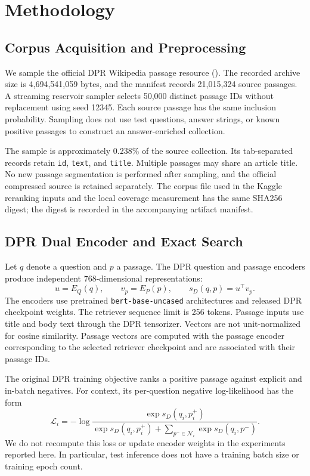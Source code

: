 \section{Methodology}
\subsection{Corpus Acquisition and Preprocessing}
We sample the official DPR Wikipedia passage resource (). The recorded archive size is 4,694,541,059 bytes, and the manifest records 21,015,324 source passages. A streaming reservoir sampler selects 50,000 distinct passage IDs without replacement using seed 12345. Each source passage has the same inclusion probability. Sampling does not use test questions, answer strings, or known positive passages to construct an answer-enriched collection.

The sample is approximately 0.238\% of the source collection. Its tab-separated records retain \texttt{id}, \texttt{text}, and \texttt{title}. Multiple passages may share an article title. No new passage segmentation is performed after sampling, and the official compressed source is retained separately. The corpus file used in the Kaggle reranking inputs and the local coverage measurement has the same SHA256 digest; the digest is recorded in the accompanying artifact manifest.

\subsection{DPR Dual Encoder and Exact Search}
Let $q$ denote a question and $p$ a passage. The DPR question and passage encoders produce independent 768-dimensional representations:
\begin{equation}
u=E_Q(q),\qquad v_p=E_P(p),\qquad s_D(q,p)=u^{\top}v_p.
\label{eq:dpr}
\end{equation}
The encoders use pretrained \texttt{bert-base-uncased} architectures and released DPR checkpoint weights. The retriever sequence limit is 256 tokens. Passage inputs use title and body text through the DPR tensorizer. Vectors are not unit-normalized for cosine similarity. Passage vectors are computed with the passage encoder corresponding to the selected retriever checkpoint and are associated with their passage IDs.

The original DPR training objective ranks a positive passage against explicit and in-batch negatives. For context, its per-question negative log-likelihood has the form
\begin{equation}
\mathcal{L}_i=-\log\frac{\exp s_D(q_i,p_i^+)}
{\exp s_D(q_i,p_i^+)+\sum_{p^-\in\mathcal{N}_i}\exp s_D(q_i,p^-)}.
\end{equation}
We do not recompute this loss or update encoder weights in the experiments reported here. In particular, test inference does not have a training batch size or training epoch count.

